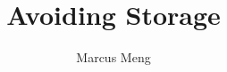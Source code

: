 \documentclass{screenplay}[2006/11/15]
\title{Avoiding Storage}
\author{Marcus Meng}
\begin{document}
\coverpage

\fadein







\fadeout

\theend
\end{document}
